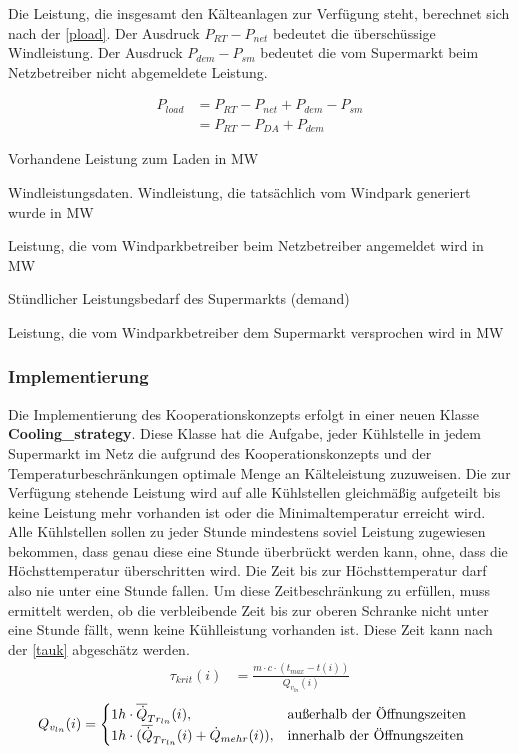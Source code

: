 Die Leistung, die insgesamt den K\"alteanlagen zur Verf\"ugung steht, berechnet
sich nach der \cref{pload}. Der Ausdruck $P_{RT} - P_{net}$ bedeutet die
\"ubersch\"ussige Windleistung. Der Ausdruck $P_{dem} - P_{sm}$  bedeutet die
vom Supermarkt beim Netzbetreiber nicht abgemeldete Leistung.

\begin{align}
	P_{load} &= P_{RT} - P_{net} + P_{dem} - P_{sm}\\
		&= P_{RT} - P_{DA} + P_{dem}
	\label{pload}
\end{align}
\begin{description}[\dth]
	\item[$P_{load}$] Vorhandene Leistung zum Laden in MW
	\item[$P_{RT}$] Windleistungsdaten. Windleistung, die tats\"achlich vom
	Windpark generiert wurde in MW
	\item[$P_{net}$] Leistung, die vom Windparkbetreiber beim Netzbetreiber
	angemeldet wird in MW
	\item[$P_{dem}$] St\"undlicher Leistungsbedarf des Supermarkts (demand)
	\item[$P_{sm}$] Leistung, die vom Windparkbetreiber dem Supermarkt
	versprochen wird in MW
\end{description} \vspace{0.5cm}

\subsubsection*{Implementierung}
Die Implementierung des Kooperationskonzepts erfolgt in einer neuen Klasse
\textbf{Cooling\_strategy}. Diese Klasse hat die Aufgabe, jeder K\"uhlstelle in
jedem Supermarkt im Netz die aufgrund des Kooperationskonzepts und der
Temperaturbeschr\"ankungen optimale Menge an K\"alteleistung zuzuweisen. Die zur
Verf\"ugung stehende Leistung wird auf alle K\"uhlstellen gleichm\"a\ss ig
aufgeteilt bis keine Leistung mehr vorhanden ist oder die Minimaltemperatur
erreicht wird. Alle K\"uhlstellen sollen zu jeder Stunde mindestens soviel
Leistung zugewiesen bekommen, dass genau diese eine Stunde \"uberbr\"uckt werden
kann, ohne, dass die H\"ochsttemperatur \"uberschritten wird. Die Zeit bis zur
H\"ochsttemperatur darf also nie unter eine Stunde fallen. Um diese
Zeitbeschr\"ankung zu erf\"ullen, muss ermittelt werden, ob die verbleibende
Zeit bis zur oberen Schranke nicht unter eine Stunde f\"allt, wenn keine
K\"uhlleistung vorhanden ist.
Diese Zeit kann nach der \cref{tauk} abgesch\"atz werden.
\begin{align}
	\tau_{krit}(i) &= \frac{m \cdot c \cdot (t_{max} -
		t(i))}{Q_{v_{ln}}(i)}
\label{tauk}
\end{align}
\begin{align*}
	Q_{v_{ln}}(i) &= \begin{cases}
	1h \cdot \overline{\dot{Q}}_{Tr_{ln}}(i), & \text{au\ss erhalb der \"Offnungszeiten}\\
	1h \cdot (\overline{\dot{Q}}_{Tr_{ln}}(i) + \dot{Q}_{mehr}(i)), & \text{innerhalb der
	\"Offnungszeiten} \end{cases}
\end{align*}

